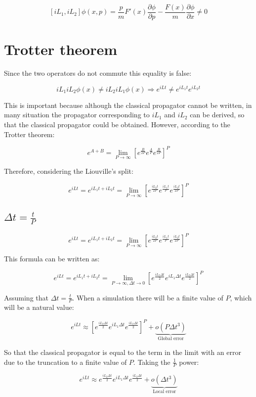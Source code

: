 	$$[iL_1, iL_2]\phi(x, p) = \frac{p}{m}F'(x)\frac{\partial \phi}{\partial p} -\frac{F(x)}{m}\frac{\partial \phi}{\partial x}\neq 0$$

\section{Trotter theorem}
Since the two operators do not commute this equality is false:

$$iL_1iL_2\phi(x)\neq iL_2iL_1\phi(x)\Rightarrow e^{iLt}\neq e^{iL_1t}e^{iL_2t}$$

This is important because although the classical propagator cannot be written, in many situation the propagator corresponding to $iL_1$ and $iL_2$ can be derived, so that the classical propagator could be obtained.
However, according to the Trotter theorem:

$$e^{A+B} = \lim\limits_{P\rightarrow\infty}[e^{\frac{B}{2P}}e^{\frac{A}{P}}e^{\frac{B}{2P}}]^P$$

Therefore, considering the Liouville's split:

$$e^{iLt} = e^{iL_1t+iL_2t} = \lim\limits_{P\rightarrow\infty}[e^{\frac{iL_2t}{2P}}e^{\frac{iL_1t}{P}}e^{\frac{iL_2t}{2P}}]^P$$

	\subsection{$\Delta t = \frac{t}{P}$}

	$$e^{iLt} = e^{iL_1t+iL_2t} = \lim\limits_{P\rightarrow\infty}[e^{\frac{iL_2t}{2P}}e^{\frac{iL_1t}{P}}e^{\frac{iL_2t}{2P}}]^P$$

	This formula  can be written as:

	$$e^{iLt} = e^{iL_1t+iL_2t} = \lim\limits_{P\rightarrow\infty, \Delta t\rightarrow 0}[e^{\frac{iL_2\Delta t}{2}}e^{iL_1\Delta t}e^{\frac{iL_2\Delta t}{2}}]^P$$

	Assuming that $\Delta t = \frac{t}{P}$.
	When a simulation there will be a finite value of $P$, which will be a natural value:

	$$e^{iLt}\approx[e^{\frac{iL_2\Delta t}{2}}e^{iL_1\Delta t}e^{\frac{iL_2\Delta t}{2}}]^P + \underbrace{o(P\Delta t^3)}_{\text{Global error}}$$

	So that the classical propagator is equal to the term in the limit with an error due to the truncation to a finite value of $P$.
	Taking the $\frac{1}{P}$ power:

	$$e^{iLt}\approx e^{\frac{iL_2\Delta t}{2}}e^{iL_1\Delta t}e^{\frac{iL_2\Delta t}{2}} + \underbrace{o(\Delta t^3)}_{\text{Local error}}$$

